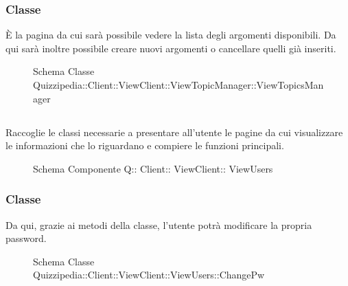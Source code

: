 \subsubsection{Classe }
È la pagina da cui sarà possibile vedere la lista degli argomenti disponibili. Da qui sarà inoltre possibile creare nuovi argomenti o cancellare quelli già inseriti.
\begin{figure}[H]
\centering
\noindent{}
\caption[Schema Classe ViewTopicsManager]{Schema Classe Quizzipedia::Client::ViewClient::ViewTopicManager::ViewTopicsManager}
\end{figure}
\subsection{}
Raccoglie le classi necessarie a presentare all'utente le pagine da cui visualizzare le informazioni che lo riguardano e compiere le funzioni principali.
\begin{figure}[H]
\centering
\noindent{}
\caption[Schema Componente Quizzipedia::Client::ViewClient::ViewUsers]{Schema Componente Q:: Client:: ViewClient:: ViewUsers}
\end{figure}
\subsubsection{Classe }
Da qui, grazie ai metodi della classe, l'utente potrà modificare la propria password.
\begin{figure}[H]
\centering
\noindent{}
\caption[Schema Classe ChangePw]{Schema Classe Quizzipedia::Client::ViewClient::ViewUsers::ChangePw}
\end{figure}

